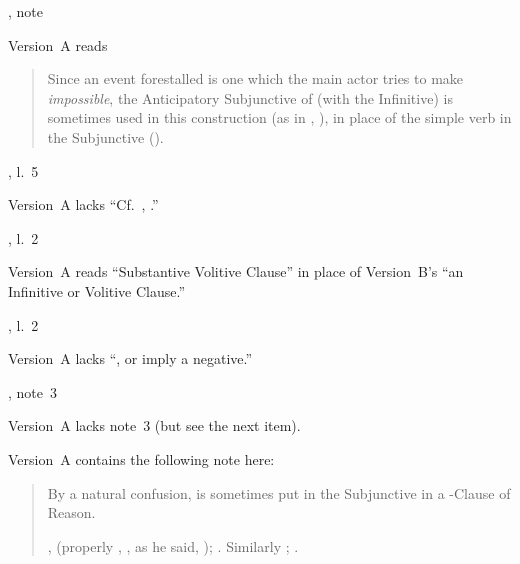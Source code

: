 \begin{variations}
\item[{\xref[4, \emph{b}]{507}, note}]

Version~A reads
\begin{quote}
Since an event forestalled is one which the main actor tries to make
\emph{impossible}, the Anticipatory Subjunctive of 
(with the Infinitive) is sometimes used in this construction (as in
, ), in place
of the simple verb in the Subjunctive ().
\end{quote}

\item[{\xref[4, \emph{d}]{507}, l.~5}]

Version~A lacks “Cf.\ , .”

\item[{\xref[1, \emph{c}]{519}, l.~2}]

Version~A reads “Substantive Volitive Clause” in place of Version~B's
“an Infinitive or Volitive Clause.”

\item[{\xref[3, \emph{b}]{521}, l.~2}]

Version~A lacks “, or imply a negative.”

\item[{\xref[\emph{a}]{535}, note~3}]

Version~A lacks note~3 (but see the next item).

\item[{\xref[\emph{b}]{535}}]

Version~A contains the following note here:
\begin{quote}
\begin{note}[Note]

By a natural confusion,  is sometimes put in the
Subjunctive in a -Clause of Reason.
\begin{examples}

,
(properly , , as he said,
);
.
Similarly ; .

\end{examples}

\end{note}
\end{quote}


\end{variations}
